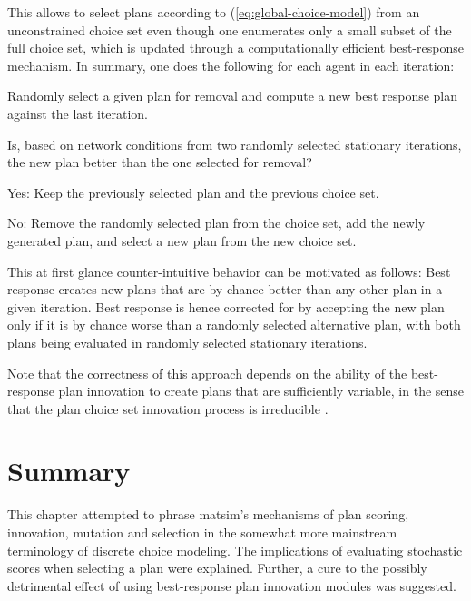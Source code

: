 This allows to select plans according to (\ref{eq:global-choice-model})
from an unconstrained choice set even though one enumerates only a
small subset of the full choice set, which is updated through a computationally
efficient best-response mechanism. In summary, one does the following
for each agent in each iteration:
\begin{compactenum}
\item Randomly select a given plan for removal and compute a new best response
plan against the last iteration.
\item Is, based on network conditions from two randomly selected stationary
iterations, the new plan better than the one selected for removal?

\begin{compactitem}
\item Yes: Keep the previously selected plan and the previous choice set.
\item No: Remove the randomly selected plan from the choice set, add the
newly generated plan, and select a new plan from the new choice set.
\end{compactitem}
\end{compactenum}
This at first glance counter-intuitive behavior can be motivated as follows:
Best response creates new plans that are by chance
better than any other plan in a given iteration. Best response is
hence corrected for by accepting the new plan only if it is by chance
worse than a randomly selected alternative plan, with both plans being
evaluated in randomly selected stationary iterations.

Note that the correctness of this approach depends on the ability
of the best-response plan innovation to create plans that are sufficiently
variable, in the sense that the plan choice set innovation process
is irreducible \citep{ross-2006}.

\section{\label{sec:Summary}Summary}
This chapter attempted to phrase \gls{matsim}'s mechanisms of plan scoring,
innovation, mutation and selection in the somewhat more mainstream
terminology of discrete choice modeling. The implications of evaluating
stochastic scores when selecting a plan were explained. Further, a
cure to the possibly detrimental effect of using best-response plan
innovation modules was suggested.

